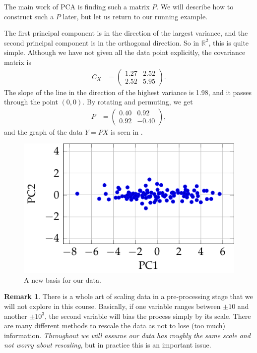 \documentclass[a4paper, 12pt]{article}
\numberwithin{equation}{section}
\numberwithin{figure}{section}
\theoremstyle{definition}
\newtheorem{remark}[thm]{Remark}
\newcommand{\R}{\mathbb{R}}
\begin{document}
The main work of PCA is finding such a matrix $P$. We will describe how to
construct such a $P$ later, but let us return to our running example.  

The first principal component is in the direction of the largest variance, and
the second principal component is in the orthogonal direction. So in $\R^2$,
this is quite simple. Although we have not given all the data point explicitly,
the covariance matrix is 
\begin{align*}
	C_X &= \begin{pmatrix}
		1.27 & 2.52 \\
		2.52 & 5.95
	\end{pmatrix}.
\end{align*}
The slope of the line in the direction of the highest variance is 1.98, and it
passes through the point $(0,0)$. By rotating and permuting, we get 
\begin{align*}
	P &= \begin{pmatrix}
		0.40 & 0.92 \\ 0.92 & -0.40 
	\end{pmatrix},
\end{align*}
and the graph of the data $Y = PX$ is seen in .

\begin{figure}[h]
    \centering
    \includegraphics{graphics/pca_example_rotated.pdf}
    \caption{A new basis for our data.}
	\label{fig:pca-example3}
\end{figure}

\begin{remark}
	There is a whole art of scaling data in a pre-processing stage that we will
	not explore in this course. Basically, if one variable ranges between $\pm
	10$ and another $\pm 10^3$, the second variable will bias the process simply
	by its scale. There are many different methods to rescale the data as not to
	lose (too much) information. \textit{Throughout we will assume our data has
	roughly the same scale and not worry about rescaling}, but in practice this
	is an important issue.
\end{remark}
\end{document}
